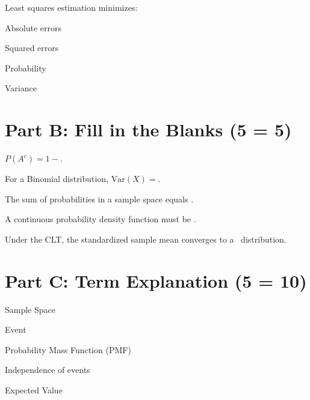 \documentclass{CWNUExam}
\begin{document}
\begin{question}
Least squares estimation minimizes:
\paren
\begin{choices}
\item Absolute errors
\item Squared errors
\item Probability
\item Variance
\end{choices}
\end{question}

\section{Part B: Fill in the Blanks (5  = 5)}

\begin{question}
$P(A^c)=1-$\fillin.
\end{question}

\begin{question}
For a Binomial distribution, $\mathrm{Var}(X)=$\fillin.
\end{question}

\begin{question}
The sum of probabilities in a sample space equals \fillin.
\end{question}

\begin{question}
A continuous probability density function must be \fillin.
\end{question}

\begin{question}
Under the CLT, the standardized sample mean converges to a \fillin\ distribution.
\end{question}

\section{Part C: Term Explanation (5  = 10)}

\begin{problem}Sample Space\end{problem}
\begin{problem}Event\end{problem}
\begin{problem}Probability Mass Function (PMF)\end{problem}
\begin{problem}Independence of events\end{problem}
\begin{problem}Expected Value\end{problem}
\end{document}
